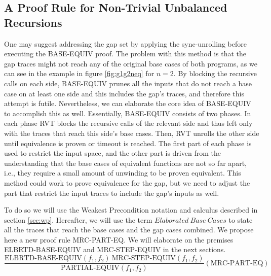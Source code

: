 \subsection{A Proof Rule for Non-Trivial Unbalanced Recursions}
One may suggest addressing the gap set by applying the sync-unrolling before executing the BASE-EQUIV proof. The problem with this method is that the gap traces might not reach any of the original base cases of both programs, as we can see in the example in figure \ref{fig:g1g2neq} for $n=2$. By blocking the recursive calls on each side, BASE-EQUIV prunes all the inputs that do not reach a base case on at least one side and this includes the gap's traces, and therefore this attempt is futile.
Nevertheless, we can elaborate the core idea of BASE-EQUIV to accomplish this as well. Essentially, BASE-EQUIV consists of two phases. In each phase RVT blocks the recursive calls of the relevant side and thus left only with the traces that reach this side's base cases. Then, RVT unrolls the other side until equivalence  is proven or timeout is reached. The first part of each phase is used to restrict the input space, and the other part is driven from the understanding that the base cases of equivalent functions are not so far apart, i.e., they require a small amount of unwinding to be proven equivalent. This method could work to prove equivalence for the gap, but we need to adjust the part that restrict the input traces to include the gap's inputs as well.

To do so we will use the Weakest Precondition notation and calculus \cite{10.1145/360933.360975} described in section \ref{sec:wp}. Hereafter, we will use the term $Elaborated\ Base\ Cases$ to state all the traces that reach the base cases and the gap cases combined. 
We propose here a new proof rule MRC-PART-EQ. We will elaborate on the premises ELBRTD-BASE-EQUIV and MRC-STEP-EQUIV in the next sections.
\begin{equation}
 {\frac {\text{ELBRTD-BASE-EQUIV}(f_1,f_2) \:\text{MRC-STEP-EQUIV}(f_1,f_2)}{\text{PARTIAL-EQUIV}(f_1,f_2)}} 
  (\text{MRC-PART-EQ})
\end{equation}

